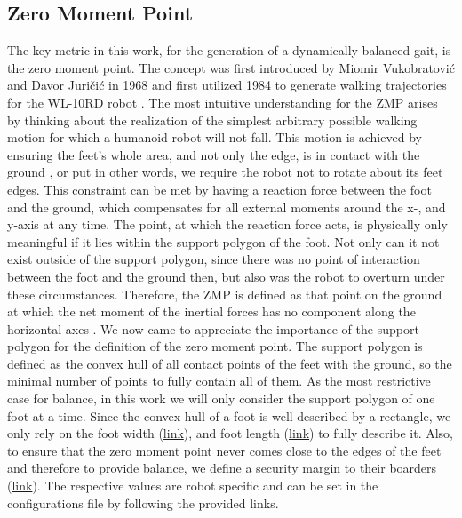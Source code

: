 \subsection{Zero Moment Point}
\label{sec::311_zmp}
The key metric in this work, for the generation of a dynamically balanced gait, is the zero moment point. The concept was first introduced by Miomir Vukobratovi\'{c} and Davor Juri\v{c}i\'{c} in 1968 \cite{vukobratovic1968contribution}\cite{vukobratovic1969contribution} and first utilized 1984 to generate walking trajectories for the WL-10RD robot \cite{yamaguchi1993development}. The most intuitive understanding for the ZMP arises by thinking about the realization of the simplest arbitrary possible walking motion for which a humanoid robot will not fall. This motion is achieved by ensuring the feet's whole area, and not only the edge, is in contact with the ground \cite{vukobratovic2004zero}, or put in other words, we require the robot not to rotate about its feet edges. This constraint can be met by having a reaction force between the foot and the ground, which compensates for all external moments around the x-, and y-axis at any time. The point, at which the reaction force acts, is physically only meaningful if it lies within the support polygon of the foot. Not only can it not exist outside of the support polygon, since there was no point of interaction between the foot and the ground then, but also was the robot to overturn under these circumstances. Therefore, the ZMP is defined as that point on the ground at which the net moment of the inertial forces has no component along the horizontal axes \cite{hirai1998development}\cite{dasgupta1999making}. We now came to appreciate the importance of the support polygon for the definition of the zero moment point. The support polygon is defined as the convex hull of all contact points of the feet with the ground, so the minimal number of points to fully contain all of them. As the most restrictive case for balance, in this work we will only consider the support polygon of one foot at a time. Since the convex hull of a foot is well described by a rectangle, we only rely on the foot width (\href{https://github.com/mhubii/nmpc_pattern_generator/blob/bc79a6d4f9bcfd3794146355af44429f5b7a9fe0/libs/pattern_generator/configs.yaml#L14}{link}), and foot length (\href{https://github.com/mhubii/nmpc_pattern_generator/blob/bc79a6d4f9bcfd3794146355af44429f5b7a9fe0/libs/pattern_generator/configs.yaml#L15}{link}) to fully describe it. Also, to ensure that the zero moment point never comes close to the edges of the feet and therefore to provide balance, we define a security margin to their boarders (\href{https://github.com/mhubii/nmpc_pattern_generator/blob/bc79a6d4f9bcfd3794146355af44429f5b7a9fe0/libs/pattern_generator/configs.yaml#L3}{link}). The respective values are robot specific and can be set in the configurations file by following the provided links.
